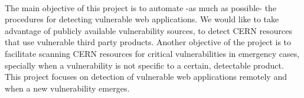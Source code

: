 \paragraph{}
The main objective of this project is to automate -as much as possible- the procedures for detecting vulnerable web applications. We would like to take advantage of publicly available vulnerability sources, to detect CERN resources that use vulnerable third party products. Another objective of the project is to facilitate scanning CERN resources for critical vulnerabilities in emergency cases, specially when a vulnerability is not specific to a certain, detectable product. This project focuses on detection of vulnerable web applications remotely and when a new vulnerability emerges.

























